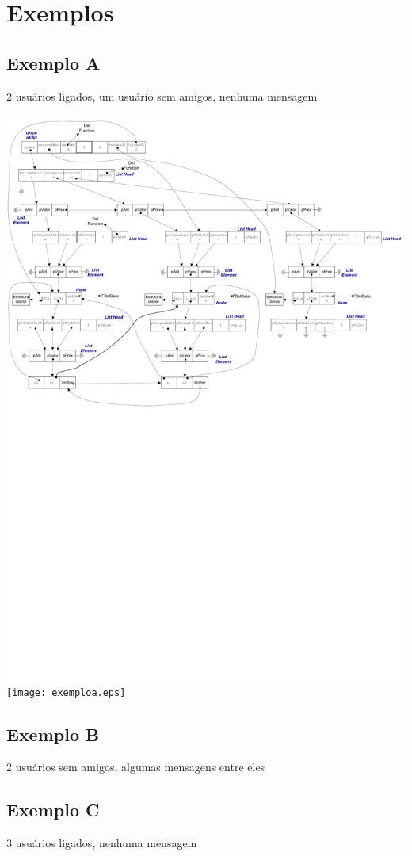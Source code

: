 \documentclass[a4paper,8pt]{article}
\begin{document}
\section{Exemplos}

\subsection{Exemplo A}

2 usuários ligados, um usuário sem amigos, nenhuma mensagem

\ifpdf
\includegraphics[width=\linewidth]{exemploa.pdf}
\else
\texttt{[image: exemploa.eps]}
\fi

\subsection{Exemplo B}

2 usuários sem amigos, algumas mensagens entre eles

\ifpdf
\else
\fi

\subsection{Exemplo C}

3 usuários ligados, nenhuma mensagem

\ifpdf
\else
\fi
\end{document}
